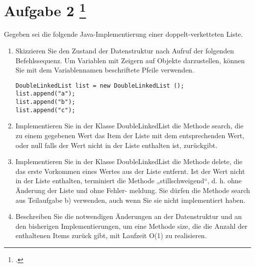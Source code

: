 \documentclass{lehramt-informatik-aufgabe}
\begin{document}
\section{Aufgabe 2
\footcite{66115:2021:03}}

Gegeben sei die folgende Java-Implementierung einer doppelt-verketteten
Liste.


\begin{enumerate}


\item Skizzieren Sie den Zustand der Datenstruktur nach Aufruf der
folgenden Befehlssequenz. Um Variablen mit Zeigern auf Objekte
darzustellen, können Sie mit dem Variablennamen beschriftete Pfeile
verwenden.

\begin{verbatim}
DoubleLinkedList list = new DoubleLinkedList ();
list.append("a");
list.append("b");
list.append("c");
\end{verbatim}

%

\item Implementieren Sie in der Klasse DoubleLinkedList die Methode
search, die zu einem gegebenen Wert das Item der Liste mit dem
entsprechenden Wert, oder null falls der Wert nicht in der Liste
enthalten ist, zurückgibt.

%

\item Implementieren Sie in der Klasse DoubleLinkedList die Methode
delete, die das erste Vorkommen eines Wertes aus der Liste entfernt. Ist
der Wert nicht in der Liste enthalten, terminiert die Methode
„stillschweigend“, d. h. ohne Änderung der Liste und ohne Fehler-
meldung. Sie dürfen die Methode search aus Teilaufgabe b) verwenden,
auch wenn Sie sie nicht implementiert haben.

%

\item Beschreiben Sie die notwendigen Änderungen an der Datenstruktur
und an den bisherigen Implementierungen, um eine Methode size, die die
Anzahl der enthaltenen Items zurück gibt, mit Laufzeit O(1) zu
realisieren.

\end{enumerate}
\end{document}
